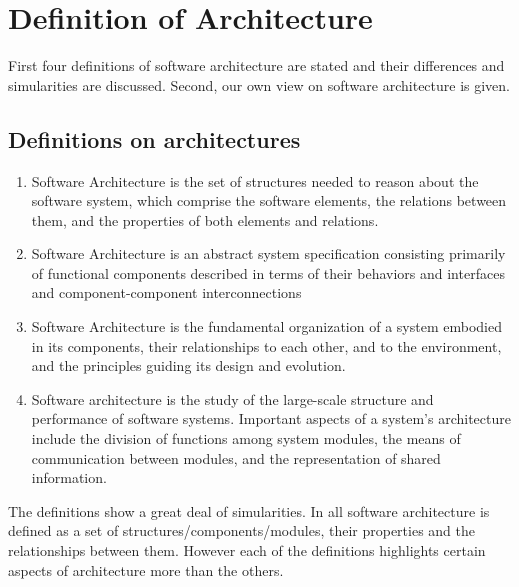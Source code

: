 \documentclass{article}
\begin{document}
\setlength\parindent{0pt}
\section{Definition of Architecture}

First four definitions of software architecture are stated and their differences and simularities are discussed. Second, our own view on software architecture is given.
\subsection{Definitions on architectures}

\begin{enumerate}
\item Software Architecture is the set of structures needed to reason about the software system, which comprise the software elements, the relations between them, and the properties of both elements and relations.\cite{clemens}

\item Software Architecture is an abstract system specification consisting primarily of functional components described in terms of their behaviors and interfaces and component-component interconnections\cite{hayesroth}

\item Software Architecture is the fundamental organization of a system embodied in its components, their relationships to each other, and to the environment, and the principles guiding its design and evolution.\cite{IEEE1471}

\item Software architecture is the study of the large-scale structure and performance of software systems. Important aspects of a system's architecture include the division of functions among system modules, the means of communication between modules, and the representation of shared information.\cite{lane90}

\end{enumerate}

The definitions show a great deal of simularities. In all software architecture is defined as a set of structures/components/modules, their properties and the relationships between them. However each of the definitions highlights certain aspects of architecture more than the others. 
\end{document}

